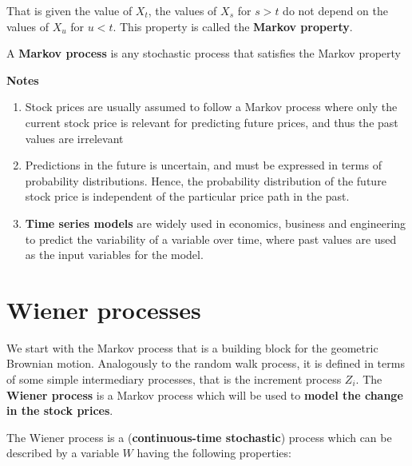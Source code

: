\documentclass[landscape, 20pt]{extreport}
\theoremstyle{definition}
\theoremstyle{definition}
\theoremstyle{definition}
\theoremstyle{definition}
\theoremstyle{remark}
\begin{document}
That is given the value of \(X_t\), the values of \(X_s\) for \(s > t\) do not
depend on the values of \(X_u\) for \(u < t\). This property is called the
\textbf{Markov property}.

A \textbf{Markov process} is any stochastic process that satisfies the Markov
property

\textbf{Notes}

\begin{enumerate}
\def\labelenumi{\arabic{enumi}.}
\item
  Stock prices are usually assumed to follow a Markov process where
  only the current stock price is relevant for predicting future
  prices, and thus the past values are irrelevant
\item
  Predictions in the future is uncertain, and must be expressed in
  terms of probability distributions. Hence, the probability
  distribution of the future stock price is independent of the
  particular price path in the past.
\item
  \textbf{Time series models} are widely used in economics, business and
  engineering to predict the variability of a variable over time,
  where past values are used as the input variables for the model.
\end{enumerate}

\hypertarget{wiener-processes}{%
\section{Wiener processes}\label{wiener-processes}}

We start with the Markov process that is a building block for the
geometric Brownian motion. Analogously to the random walk process, it is
defined in terms of some simple intermediary processes, that is the
increment process \(Z_i\). The \textbf{Wiener process} is a Markov process
which will be used to \textbf{model the change in the stock prices}.

The Wiener process is a (\textbf{continuous-time stochastic}) process which
can be described by a variable \(W\) having the following properties:
\end{document}
